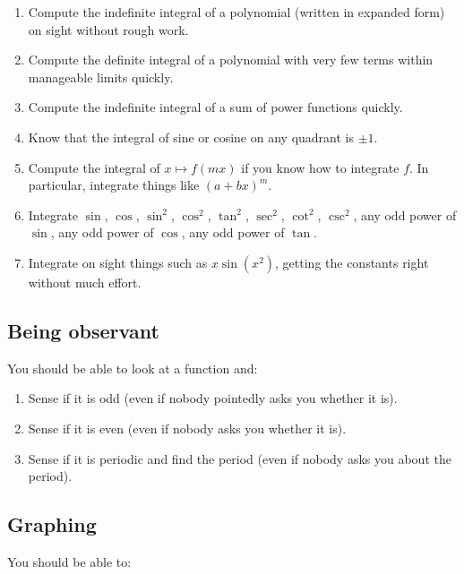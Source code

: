 \documentclass[10pt]{amsart}
\begin{document}
\begin{enumerate}
\item Compute the indefinite integral of a polynomial (written in
  expanded form) on sight without rough work.
\item Compute the definite integral of a polynomial with very few
  terms within manageable limits quickly.
\item Compute the indefinite integral of a sum of power functions
  quickly.
\item Know that the integral of sine or cosine on any quadrant is $\pm
  1$.
\item Compute the integral of $x \mapsto f(mx)$ if you know how to
  integrate $f$. In particular, integrate things like $(a + bx)^m$.
\item Integrate $\sin$, $\cos$, $\sin^2$, $\cos^2$, $\tan^2$,
  $\sec^2$, $\cot^2$, $\csc^2$, any odd power of $\sin$, any odd power
  of $\cos$, any odd power of $\tan$.
\item Integrate on sight things such as $x\sin(x^2)$, getting the
  constants right without much effort.
\end{enumerate}
\subsection{Being observant}

You should be able to look at a function and:

\begin{enumerate}
\item Sense if it is odd (even if nobody pointedly asks you whether it
  is).
\item Sense if it is even (even if nobody asks you whether it is).
\item Sense if it is periodic and find the period (even if nobody asks
  you about the period).
\end{enumerate}

\subsection{Graphing}

You should be able to:
\end{document}

